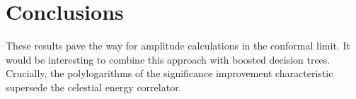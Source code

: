 \section{Conclusions}\label{sec:conclusions}

These results pave the way for amplitude calculations in the conformal
limit. It would be interesting to combine this approach with boosted
decision trees. Crucially, the polylogarithms of the significance
improvement characteristic supersede the celestial energy correlator.

